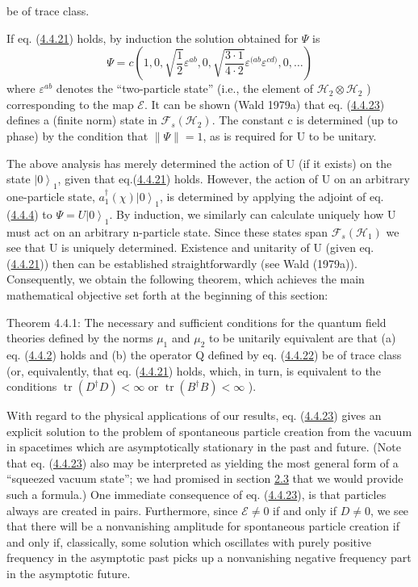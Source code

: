 \documentclass[11pt,a4paper]{article}
\providecommand{\ket}[1]{\left\lvert#1\right\rangle}
\begin{document}
be of trace class.

If eq. (\hyperref[eq:4.4.21]{4.4.21}) holds, by induction the solution obtained for \(\Psi\) is
\begin{equation*}
\Psi = c\left(1, 0, \sqrt{\frac{1}{2}} \varepsilon^{ab}, 0, \sqrt{\frac{3 \cdot 1}{4 \cdot 2}} \varepsilon^{(ab} \varepsilon^{cd)}, 0, \dots\right) \tag{4.4.23}\label{eq:4.4.23}
\end{equation*} \hypertarget{source-84}{} where \(\varepsilon^{ab}\) denotes the ``two-particle state'' (i.e., the element of \(\mathcal{H}_2 \otimes \mathcal{H}_2\) ) corresponding to the map \(\mathcal{E}\). It can be shown (Wald 1979a) that eq. (\hyperref[eq:4.4.23]{4.4.23}) defines a (finite norm) state in \(\mathcal{F}_s(\mathcal{H}_2)\). The constant c is determined (up to phase) by the condition that \(\|\Psi\|=1\), as is required for U to be unitary.

The above analysis has merely determined the action of U (if it exists) on the state \(\ket{0}_1\), given that eq.(\hyperref[eq:4.4.21]{4.4.21}) holds. However, the action of U on an arbitrary one-particle state, \(a_1^{\dagger}(\chi)\ket{0}_1\), is determined by applying the adjoint of eq. (\hyperref[eq:4.4.4]{4.4.4}) to \(\Psi=U\ket{0}_1\). By induction, we similarly can calculate uniquely how U must act on an arbitrary n-particle state. Since these states span \(\mathcal{F}_s(\mathcal{H}_1)\) we see that U is uniquely determined. Existence and unitarity of U (given eq. (\hyperref[eq:4.4.21]{4.4.21})) then can be established straightforwardly (see Wald (1979a)). Consequently, we obtain the following theorem, which achieves the main mathematical objective set forth at the beginning of this section:

Theorem 4.4.1: The necessary and sufficient conditions for the quantum field theories defined by the norms \(\mu_1\) and \(\mu_2\) to be unitarily equivalent are that (a) eq. (\hyperref[eq:4.4.2]{4.4.2}) holds and (b) the operator Q defined by eq. (\hyperref[eq:4.4.22]{4.4.22}) be of trace class (or, equivalently, that eq. (\hyperref[eq:4.4.21]{4.4.21}) holds, which, in turn, is equivalent to the conditions \(\operatorname{tr}(D^{\dagger}D) < \infty\) or \(\operatorname{tr}(B^{\dagger}B) < \infty\) ).

With regard to the physical applications of our results, eq. (\hyperref[eq:4.4.23]{4.4.23}) gives an explicit solution to the problem of spontaneous particle creation from the vacuum in spacetimes which are asymptotically stationary in the past and future. (Note that eq. (\hyperref[eq:4.4.23]{4.4.23}) also may be interpreted as yielding the most general form of a ``squeezed vacuum state''; we had promised in section \hyperlink{sec:2.3}{2.3} that we would provide such a formula.) One immediate consequence of eq. (\hyperref[eq:4.4.23]{4.4.23}), is that particles always are created in pairs. Furthermore, since \(\mathcal{E} \neq 0\) if and only if \(D \neq 0\), we see that there will be a nonvanishing amplitude for spontaneous particle creation if and only if, classically, some solution which oscillates with purely positive frequency in the asymptotic past picks up a nonvanishing negative frequency part in the asymptotic future.
\end{document}
